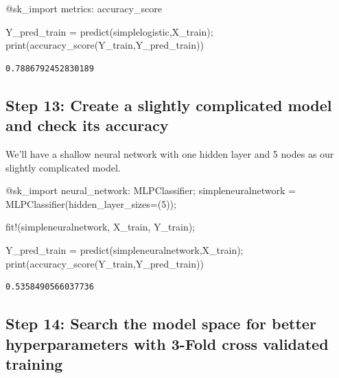 \documentclass[
  letterpaper,
]{book}
\newenvironment{Shaded}{\begin{snugshade}}{\end{snugshade}}
\newcommand{\FloatTok}[1]{\textcolor[rgb]{0.68,0.00,0.00}{#1}}
\newcommand{\FunctionTok}[1]{\textcolor[rgb]{0.28,0.35,0.67}{#1}}
\newcommand{\NormalTok}[1]{\textcolor[rgb]{0.00,0.23,0.31}{#1}}
\newcommand{\OperatorTok}[1]{\textcolor[rgb]{0.37,0.37,0.37}{#1}}
\newcommand{\PreprocessorTok}[1]{\textcolor[rgb]{0.68,0.00,0.00}{#1}}
\begin{document}
\begin{Shaded}
\begin{Highlighting}[]
\PreprocessorTok{@sk\_import}\NormalTok{ metrics}\OperatorTok{:}\NormalTok{ accuracy\_score}

\NormalTok{Y\_pred\_train }\OperatorTok{=} \FunctionTok{predict}\NormalTok{(simplelogistic,X\_train);}
\FunctionTok{print}\NormalTok{(}\FunctionTok{accuracy\_score}\NormalTok{(Y\_train,Y\_pred\_train))}
\end{Highlighting}
\end{Shaded}

\begin{verbatim}
0.7886792452830189
\end{verbatim}

\hypertarget{step-13-create-a-slightly-complicated-model-and-check-its-accuracy}{%
\subsection*{Step 13: Create a slightly complicated model and check its
accuracy}\label{step-13-create-a-slightly-complicated-model-and-check-its-accuracy}}

We'll have a shallow neural network with one hidden layer and 5 nodes as
our slightly complicated model.

\begin{Shaded}
\begin{Highlighting}[]
\PreprocessorTok{@sk\_import}\NormalTok{ neural\_network}\OperatorTok{:}\NormalTok{ MLPClassifier;}
\NormalTok{simpleneuralnetwork }\OperatorTok{=} \FunctionTok{MLPClassifier}\NormalTok{(hidden\_layer\_sizes}\OperatorTok{=}\NormalTok{(}\FloatTok{5}\NormalTok{));}

\FunctionTok{fit!}\NormalTok{(simpleneuralnetwork, X\_train, Y\_train);}

\NormalTok{Y\_pred\_train }\OperatorTok{=} \FunctionTok{predict}\NormalTok{(simpleneuralnetwork,X\_train);}
\FunctionTok{print}\NormalTok{(}\FunctionTok{accuracy\_score}\NormalTok{(Y\_train,Y\_pred\_train))}
\end{Highlighting}
\end{Shaded}

\begin{verbatim}
0.5358490566037736
\end{verbatim}

\hypertarget{step-14-search-the-model-space-for-better-hyperparameters-with-3-fold-cross-validated-training}{%
\subsection*{Step 14: Search the model space for better hyperparameters
with 3-Fold cross validated
training}\label{step-14-search-the-model-space-for-better-hyperparameters-with-3-fold-cross-validated-training}}
\end{document}
